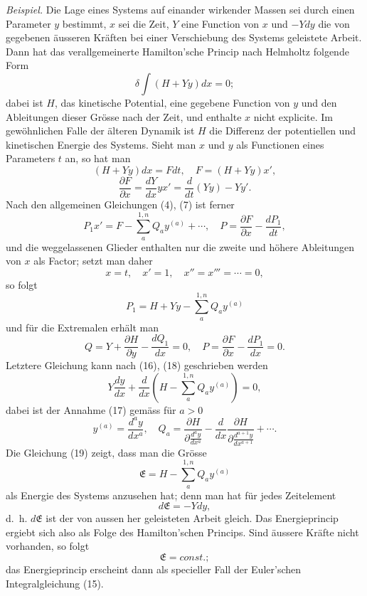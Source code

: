 \documentclass[11pt,a4paper,leqno]{article}
\begin{document}
\emph{Beispiel.} Die Lage eines Systems auf einander wirkender Massen sei durch einen Parameter $y$ bestimmt, $x$ sei die Zeit, $Y$ eine Function von $x$ und $-Ydy$ die von gegebenen äusseren Kräften bei einer Verschiebung des Systems geleistete Arbeit. Dann hat das verallgemeinerte Hamilton'sche Princip nach Helmholtz folgende Form
\[
\delta\int(H+Yy)dx=0;
\]
dabei ist $H$, das kinetische Potential, eine gegebene Function von $y$ und den Ableitungen dieser Grösse nach der Zeit, und enthalte $x$ nicht explicite. Im gewöhnlichen Falle der älteren Dynamik ist $H$ die Differenz der potentiellen und kinetischen Energie des Systems. Sieht man $x$ und $y$ als Functionen eines Parameters $t$ an, so hat man
\[
(H+Yy)dx=Fdt,\quad F=(H+Yy)x',
\]
\begin{equation}\tag{16}
\frac{\partial F}{\partial x}=\frac{dY}{dx}yx'=\frac{d}{dt}(Yy)-Yy'.
\end{equation}
Nach den allgemeinen Gleichungen (4), (7) ist ferner
\[
P_1x'=F-\sum_a^{1,n}Q_ay^{(a)}+\cdots,\quad
P=\frac{\partial F}{\partial x}-\frac{dP_1}{dt},
\]
und die weggelassenen Glieder enthalten nur die zweite und höhere Ableitungen von $x$ als Factor; setzt man daher
\begin{equation}\tag{17}
x=t,\quad x'=1,\quad x''=x'''=\cdots=0,
\end{equation}
so folgt
\begin{equation}\tag{18}
P_1=H+Yy-\sum_a^{1,n}Q_ay^{(a)}
\end{equation}
und für die Extremalen erhält man
\[
Q=Y+\frac{\partial H}{\partial y}-\frac{dQ_1}{dx}=0,
\quad
P=\frac{\partial F}{\partial x}-\frac{dP_1}{dx}=0.
\]
Letztere Gleichung kann nach (16), (18) geschrieben werden
\begin{equation}\tag{19}
Y\frac{dy}{dx}+\frac{d}{dx}\left(H-\sum_a^{1,n}Q_ay^{(a)}\right)=0,
\end{equation}
dabei ist der Annahme (17) gemäss für $a>0$
\[
y^{(a)}=\frac{d^ay}{dx^a},\quad
Q_a=\frac{\partial H}{\partial\frac{d^ay}{dx^a}}-\frac{d}{dx}\frac{\partial H}{\partial\frac{d^{a+1}y}{dx^{a+1}}}+\cdots.
\]
Die Gleichung (19) zeigt, dass man die Grösse
\[
\mathfrak E=H-\sum_a^{1,n}Q_ay^{(a)}
\]
als Energie des Systems anzusehen hat; denn man hat für jedes Zeitelement
\[
d\mathfrak E=-Ydy,
\]
 d.~h. $d\mathfrak E$ ist der von aussen her geleisteten Arbeit gleich. Das Energieprincip ergiebt sich also als Folge des Hamilton'schen Princips. Sind äussere Kräfte nicht vorhanden, so folgt
\[
\mathfrak E=const.;
\]
das Energieprincip erscheint dann als specieller Fall der Euler'schen Integralgleichung (15).
\end{document}
